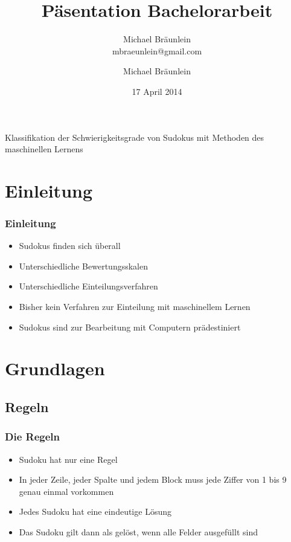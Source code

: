 \documentclass[accentcolor=tud6b,colorbacktitle,inverttitle,landscape,german,presentation,t]{tudbeamer}
\begin{document}
\title[Klassifikation der Schwierigkeitsgrade von Sudokus mit Methoden des maschinellen Lernens]{Päsentation Bachelorarbeit}
\subtitle{Michael Bräunlein\\mbraeunlein@gmail.com}

\author[M. Bräunlein]{Michael Bräunlein}


\date{17 April 2014}

\begin{titleframe}
\centering \LARGE Klassifikation der Schwierigkeitsgrade von Sudokus mit Methoden des maschinellen Lernens
\end{titleframe}

\section{Einleitung}
	\begin{frame}
	\frametitle{Einleitung}
	\begin{itemize}
	\item Sudokus finden sich überall
	\item Unterschiedliche Bewertungsskalen
	\item Unterschiedliche Einteilungsverfahren
	\item Bisher kein Verfahren zur Einteilung mit maschinellem Lernen
	\item Sudokus sind zur Bearbeitung mit Computern prädestiniert
	\end{itemize}
	\end{frame}

\section{Grundlagen}
	\subsection{Regeln}
		\begin{frame}
		\frametitle{Die Regeln}
		\begin{itemize}
		\item Sudoku hat nur eine Regel
		\item In jeder Zeile, jeder Spalte und jedem Block muss jede Ziffer von 1 bis 9 genau einmal vorkommen
		\item Jedes Sudoku hat eine eindeutige Lösung
		\item Das Sudoku gilt dann als gelöst, wenn alle Felder ausgefüllt sind
		\end{itemize}
		\end{frame}
\end{document}
